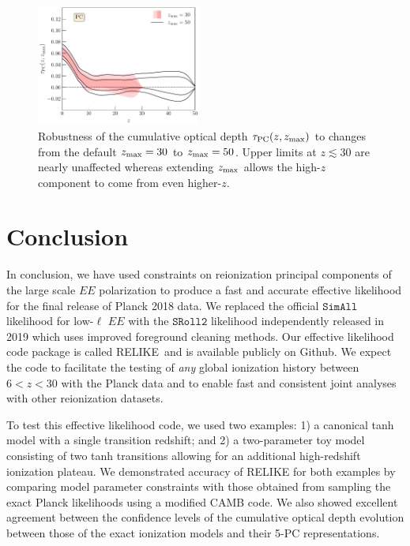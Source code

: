 \documentclass[aps,prd,twocolumn,amsmath,amssymb,showpacs,floatfix,superscriptaddress,nofootinbib]{revtex4-1}
\newcommand{\zmax}{z_{\rm max}}
\newcommand{\relike}{RELIKE}
\begin{document}
{\begin{figure}[ht]
\includegraphics[width=0.48\textwidth]{pl18_taugtz_pl18_srollv2_pc_zmax30_vs_zmax50_do_rescale_tau_false.pdf}
\caption{Robustness of the cumulative optical depth $\tau_{\rm PC}(z, \zmax)$ to changes from the default $\zmax = 30$ to $\zmax = 50$. Upper limits at $z \lesssim 30$ are nearly unaffected whereas extending $\zmax$ allows the high-$z$ component to come from even higher-$z$.
}
\label{fig:plot_taugtz_zmax30_vs_zmax50}
\end{figure}


\section{Conclusion}
\label{sec:conclusion}

In conclusion, we have used constraints on reionization principal components of the large scale $EE$ polarization to produce a fast and accurate effective likelihood for the final release of Planck 2018 data.  We replaced the official $\texttt{SimAll}$ likelihood for low-$\ell$ $EE$ with the $\texttt{SRoll2}$ likelihood independently released in 2019 which uses improved foreground cleaning methods. Our effective likelihood code package is called \relike\  and is available publicly on Github.
We expect the code to facilitate the testing of \textit{any} global ionization history between $6 < z < 30$ with the Planck data and to enable fast and consistent joint analyses with other reionization datasets. 

To test this effective likelihood code, we used two examples: 1) a canonical tanh model with a single transition redshift; and 2) a two-parameter toy model consisting of two tanh transitions allowing for an additional high-redshift ionization plateau. We demonstrated accuracy of RELIKE for both examples by comparing model parameter constraints with those obtained from sampling the exact Planck likelihoods using a modified CAMB code. We also showed excellent agreement between the confidence levels of the cumulative optical depth evolution between those of the exact ionization models and their 5-PC representations.

}
\end{document}
